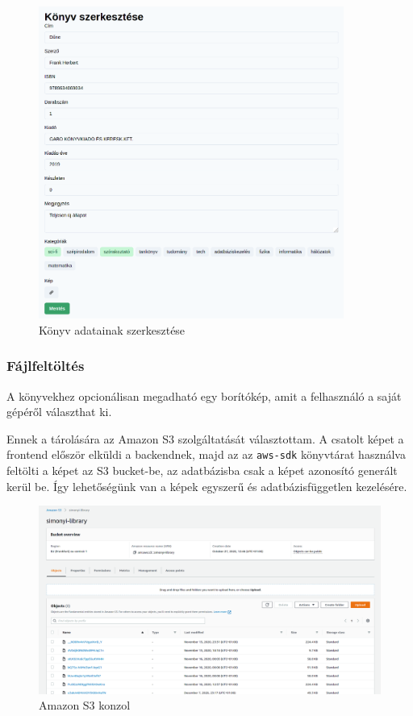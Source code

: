\begin{figure}[!ht]
  \centering
  \includegraphics[width=100mm, keepaspectratio]{figures/book-edit.png}
  \caption{Könyv adatainak szerkesztése}
  \label{fig:BookEdit}
\end{figure}


\subsubsection{Fájlfeltöltés}

A könyvekhez opcionálisan megadható egy borítókép, amit a felhasználó a saját gépéről választhat ki.

Ennek a tárolására az Amazon S3 szolgáltatását választottam. A csatolt képet a frontend először elküldi a backendnek,
majd az az \lstinline|aws-sdk| könyvtárat használva feltölti a képet az S3 bucket-be, az adatbázisba csak a képet
azonosító generált kerül be. Így lehetőségünk van a képek egyszerű és adatbázisfüggetlen kezelésére.

\begin{figure}[!ht]
  \centering
  \includegraphics[width=125mm, keepaspectratio]{figures/s3-dashboard.png}
  \caption{Amazon S3 konzol}
  \label{fig:S3Console}
\end{figure}

